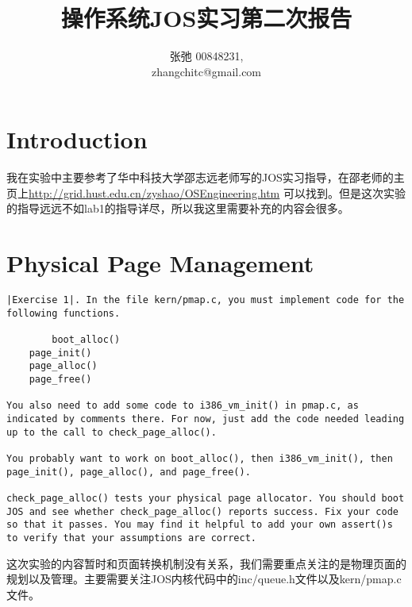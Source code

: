 \documentclass{article}
\begin{document}
\begin{CJK*}{UTF8}{gkai}

\title{操作系统JOS实习第二次报告}
\author{张弛 \hspace{1ex} 00848231, \\
        zhangchitc@gmail.com}

\maketitle
\tableofcontents
\newpage

\section{Introduction}

我在实验中主要参考了华中科技大学邵志远老师写的JOS实习指导，在邵老师的主页上{\scriptsize \url{http://grid.hust.edu.cn/zyshao/OSEngineering.htm}} 可以找到。但是这次实验的指导远远不如lab1的指导详尽，所以我这里需要补充的内容会很多。

\section{Physical Page Management}


\begin{lstlisting}[style=exercise]
|Exercise 1|. In the file kern/pmap.c, you must implement code for the following functions.

        boot_alloc()
	page_init()
	page_alloc()
	page_free()
	
You also need to add some code to i386_vm_init() in pmap.c, as indicated by comments there. For now, just add the code needed leading up to the call to check_page_alloc().

You probably want to work on boot_alloc(), then i386_vm_init(), then page_init(), page_alloc(), and page_free().

check_page_alloc() tests your physical page allocator. You should boot JOS and see whether check_page_alloc() reports success. Fix your code so that it passes. You may find it helpful to add your own assert()s to verify that your assumptions are correct.
\end{lstlisting}

这次实验的内容暂时和页面转换机制没有关系，我们需要重点关注的是物理页面的规划以及管理。主要需要关注JOS内核代码中的inc/queue.h文件以及kern/pmap.c文件。


\end{CJK*}
\end{document}

